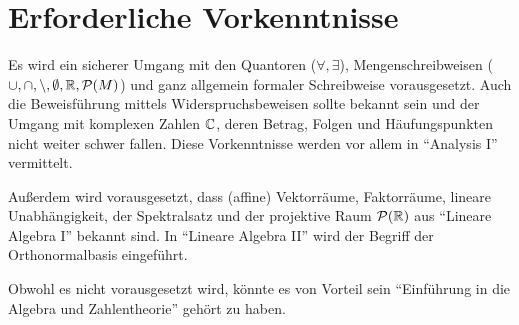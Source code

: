 \section*{Erforderliche Vorkenntnisse}
Es wird ein sicherer Umgang mit den Quantoren ($\forall, \exists$),
Mengenschreibweisen ($\cup, \cap, \setminus, \emptyset, \mathbb{R}, \mathcal{P}(M)$)
und ganz allgemein formaler Schreibweise vorausgesetzt. Auch die
Beweisführung mittels Widerspruchsbeweisen sollte bekannt sein und
der Umgang mit komplexen Zahlen $\mathbb{C}$, deren Betrag, Folgen und
Häufungspunkten nicht weiter schwer fallen.
Diese Vorkenntnisse werden vor allem in \enquote{Analysis I} vermittelt.

Außerdem wird vorausgesetzt, dass (affine) Vektorräume, Faktorräume, 
lineare Unabhängigkeit, der Spektralsatz und der projektive Raum $\mathcal{P}(\mathbb{R})$ aus
\enquote{Lineare Algebra I} bekannt sind. In \enquote{Lineare Algebra II}
wird der Begriff der Orthonormalbasis eingeführt.

Obwohl es nicht vorausgesetzt wird, könnte es von Vorteil sein
\enquote{Einführung in die Algebra und Zahlentheorie} gehört zu 
haben.
